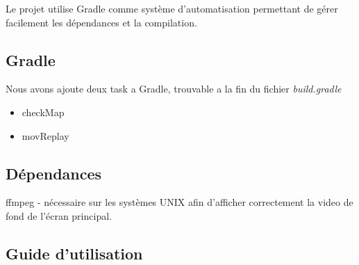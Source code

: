 \documentclass[../main.tex]{subfiles}
\begin{document}
Le projet utilise Gradle comme système d'automatisation permettant de gérer facilement les dépendances et la compilation.
\subsection{Gradle}
Nous avons ajoute deux task a Gradle, trouvable a la fin du fichier \textit{build.gradle}
\begin{itemize}
    \item checkMap
    \item movReplay
\end{itemize}
\subsection{Dépendances}
ffmpeg - nécessaire sur les systèmes UNIX afin d'afficher correctement la video de fond de l'écran principal.
\subsection{Guide d'utilisation}
\end{document}
